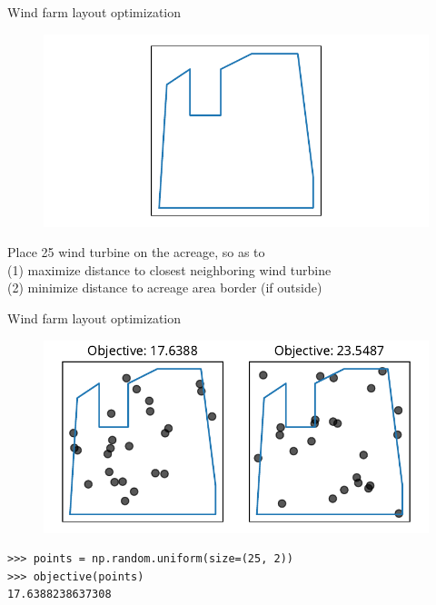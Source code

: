 \documentclass[12pt, aspectratio=149]{beamer}
\theoremstyle{plain}
\begin{document}
\begin{frame}[fragile]{Wind farm layout optimization}
\vspace*{-1em}
\begin{center}
 \begin{figure}
    	\centering
    	\includegraphics[width=0.99\linewidth]{figures/windfarm}
 \end{figure}
 \end{center}
\vspace*{-2em}
\begin{center}
Place 25 wind turbine on the acreage, so as to\\
(1) maximize distance to closest neighboring wind turbine \\
(2) minimize distance to acreage area border (if outside)
\end{center}
\end{frame}

\begin{frame}[fragile]{Wind farm layout optimization}
\vspace*{-1em}
\begin{center}
 \begin{figure}
    	\centering
    	\includegraphics[width=0.99\linewidth]{figures/windfarm_random_solution}
 \end{figure}
 \end{center}
\vspace*{-2em}
\begin{center}
\begin{verbatim}
>>> points = np.random.uniform(size=(25, 2))
>>> objective(points)
17.6388238637308
\end{verbatim}
\end{center}
\end{frame}
\end{document}
